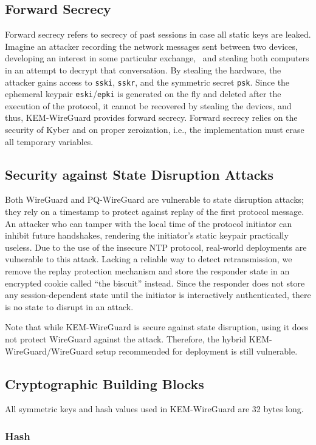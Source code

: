 \subsection{Forward Secrecy}
Forward secrecy refers to secrecy of past sessions in case all static
keys are leaked. Imagine an attacker recording the network messages sent
between two devices, developing an interest in some particular exchange,
~and stealing both computers in an attempt to decrypt that conversation.
By stealing the hardware, the attacker gains access to \texttt{sski},
\texttt{sskr}, and the symmetric secret \texttt{psk}. Since the
ephemeral keypair \texttt{eski}/\texttt{epki} is generated on the fly
and deleted after the execution of the protocol, it cannot be recovered
by stealing the devices, and thus, KEM-WireGuard provides forward secrecy.
Forward secrecy relies on the security of Kyber and on proper
zeroization, i.e., the implementation must erase all temporary
variables.
\subsection{Security against State Disruption Attacks}

Both WireGuard and PQ-WireGuard are vulnerable to state disruption attacks; they rely
on a timestamp to protect against replay of the first protocol message.
An attacker who can tamper with the local time of the protocol initiator
can inhibit future handshakes, rendering the initiator's static keypair practically useless. Due to the use of the insecure NTP
protocol, real-world deployments are vulnerable to this attack. Lacking a reliable way to detect retransmission,
we remove the replay protection mechanism and store the responder state
in an encrypted cookie called ``the biscuit'' instead. Since the
responder does not store any session-dependent state until the initiator
is interactively authenticated, there is no state to disrupt in an
attack.

Note that while KEM-WireGuard is secure against state disruption, using it
does not protect WireGuard against the attack. Therefore, the hybrid
KEM-WireGuard/WireGuard setup recommended for deployment is still
vulnerable.

\subsection{Cryptographic Building Blocks}
All symmetric keys and hash values used in KEM-WireGuard are 32 bytes long.
\subsubsection{Hash}

